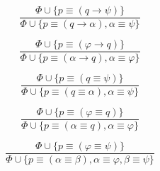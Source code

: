 \documentclass{article}
\theoremstyle{definition}
\newcommand*{\eq}{\equiv}
\newcommand*{\ra}{\rightarrow}
\begin{document}
\begin{figure}
\begin{subfigure}{\textwidth}
\begin{subfigure}{0.5\textwidth}
\begin{equation}
            \end{equation}
        \end{subfigure}
        \begin{subfigure}{0.4\textwidth}
            \begin{equation}
                \tag{$ \eq_\ra^l $}
                \frac{
                    \Phi \cup \{ p \eq (q \ra \psi) \} }%
                { \Phi \cup \{ p \eq (q \ra \alpha), \alpha \eq \psi  \} }
            \end{equation}
        \end{subfigure}
        \begin{subfigure}{0.4\textwidth}
            \begin{equation}
                \tag{$ \eq_\ra^r $}
                \frac{
                    \Phi \cup \{ p \eq (\varphi \ra q) \} }%
                { \Phi \cup \{ p \eq (\alpha \ra q), \alpha \eq \varphi  \} }
            \end{equation}
        \end{subfigure}
        \begin{subfigure}{0.4\textwidth}
            \begin{equation}
                \tag{$ \eq_\eq^l $}
                \frac{
                    \Phi \cup \{ p \eq (q \eq \psi) \} }%
                { \Phi \cup \{ p \eq (q \eq \alpha), \alpha \eq \psi  \} }
            \end{equation}
        \end{subfigure}
        \begin{subfigure}{0.4\textwidth}
            \begin{equation}
                \tag{$ \eq_\eq^r$}
                \frac{
                    \Phi \cup \{ p \eq (\varphi \eq q) \} }%
                { \Phi \cup \{ p \eq (\alpha \eq q), \alpha \eq \varphi \} }
            \end{equation}
        \end{subfigure}
        \begin{subfigure}{0.45\textwidth}
            \begin{equation}
                \tag{$ \eq_\eq $}
                \frac{
                    \Phi \cup \{ p \eq (\varphi \eq \psi) \} }%
                { \Phi \cup \{ p \eq (\alpha \eq \beta), \alpha \eq \varphi, \beta \eq \psi \} }
            \end{equation}
        \end{subfigure}
        \begin{subfigure}{0.4\textwidth}

\end{subfigure}
\end{subfigure}
\end{figure}
\end{document}
